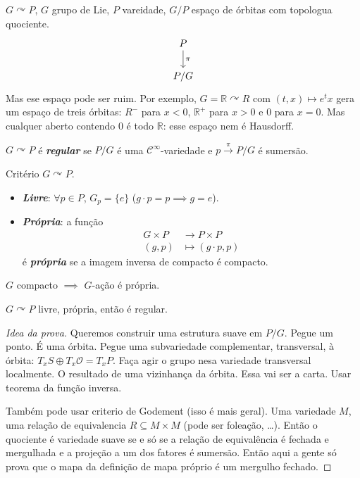 $G \curvearrowright P$, $G$ grupo de Lie, $P$ vareidade, $G/P$ espaço de órbitas com topologua quociente.
\[\begin{tikzcd}
P\arrow[d,"\pi"]\\
P/G
\end{tikzcd}\]
Mas ese espaço pode ser ruim. Por exemplo, $G=\mathbb{R}\curvearrowright R$ com $(t,x)\mapsto e^tx$ gera um espaço de treis órbitas: $R^-$ para $x<0$,  $\mathbb{R}^+$ para $x>0$ e  $0$ para  $x=0$. Mas cualquer aberto contendo  $0$  é todo $\mathbb{R}$: esse espaço nem é Hausdorff.

\begin{defn}\leavevmode
	$G \curvearrowright P$ é \textit{\textbf{regular}} se  $P/G$  é uma $\mathcal{C}^\infty$-variedade e $p\overset{\pi}{\longrightarrow}P/G$ é sumersão.
\end{defn}

\begin{thing2}{Critério}\leavevmode
	$G \curvearrowright P$.
	\begin{itemize}
	\item \textit{\textbf{Livre}}: $\forall  p \in P$, $G_p=\{e\}$ ($g\cdot p=p \implies g=e$).
	\item \textit{\textbf{Própria}}: a função
		\begin{align*}
			G\times P &\longrightarrow P\times P \\
			(g,p) &\longmapsto (g\cdot p,p)
		\end{align*}
		é \textit{\textbf{própria}} se a imagem inversa de compacto é compacto.
	\end{itemize}
\end{thing2}

\begin{example}\leavevmode
	$G$ compacto $\implies $ $G$-ação é própria.
\end{example}

\begin{thm}[Palais]\leavevmode
	$G \curvearrowright P$ livre, própria, então é regular.
\end{thm}

\begin{proof}[Idea da prova]\leavevmode
	Queremos construir uma estrutura suave em $P/G$. Pegue um ponto.  É uma órbita. Pegue uma subvariedade complementar, transversal, à órbita: $T_{x}S\oplus T_{x}\mathcal{O}=T_{x}P$. Faça agir o grupo nesa variedade transversal localmente. O resultado de uma vizinhança da órbita. Essa vai ser a carta. Usar teorema da função inversa.

	Também pode usar criterio de Godement (isso é mais geral). Uma variedade $M$, uma relação de equivalencia $R \subseteq M\times M$ (pode ser foleação, …). Então o quociente é variedade suave se e só se a relação de equivalência é fechada e mergulhada e a projeção a um dos fatores é sumersão. Então aqui a gente só prova que o mapa da definição de mapa próprio é um mergulho  fechado.
\end{proof}




